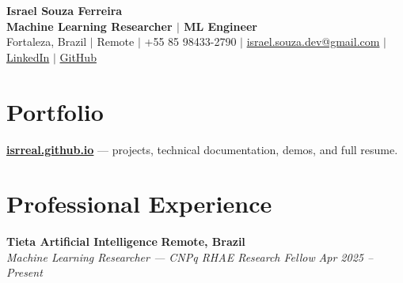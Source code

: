 \documentclass[a4paper,10pt]{article}
\newcommand{\entry}[4]{%
    \noindent
    \textbf{#1}
    \hfill
    \textbf{#2}\\[-1pt]
    \textit{#3}
    \hfill
    \textit{#4}\par
}
\begin{document}
\begin{center}

    {\LARGE\textbf{Israel Souza Ferreira}}\\[1pt]

    {\normalsize
        \textbf{Machine Learning Researcher
        \enspace $|$ \enspace
        ML Engineer}
    }\\[2pt]

    {\small
        Fortaleza, Brazil
        \enspace $|$ \enspace
        Remote
        \enspace $|$ \enspace
        +55 85 98433-2790
        \enspace $|$ \enspace
        \href{mailto:israel.souza.dev@gmail.com}
        {israel.souza.dev@gmail.com}
        \enspace $|$ \enspace
        \href{https://www.linkedin.com/in/isrreal/}
        {LinkedIn}
        \enspace $|$ \enspace
        \href{https://github.com/isrreal}
        {GitHub}
    }

\end{center}

\vspace{-3pt}
\small

\section*{Portfolio}

\href{https://isrreal.github.io/}
{\textbf{isrreal.github.io}}
--- projects, technical documentation, demos, and full resume.

\section*{Professional Experience}

\entry
    {Tieta Artificial Intelligence}
    {Remote, Brazil}
    {Machine Learning Researcher --- CNPq RHAE Research Fellow}
    {Apr 2025 -- Present}
\end{document}
